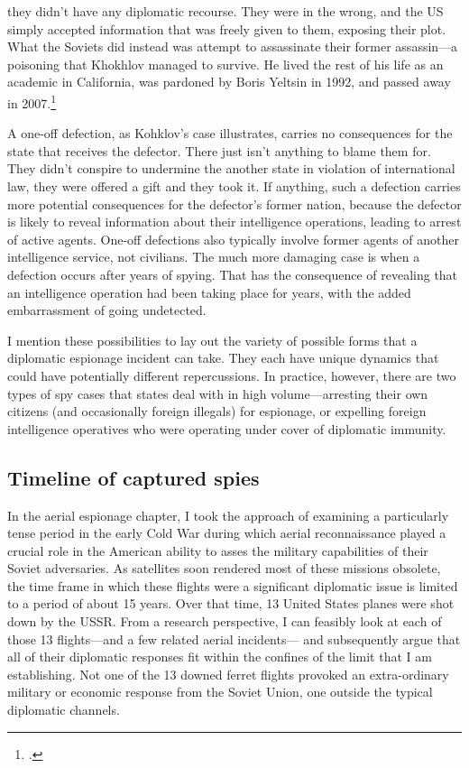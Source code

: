 \documentclass{report}
\begin{document}
\begin{refsegment}
they didn't have any diplomatic recourse. They were in the wrong, and the US simply accepted information that was freely given to them, exposing their plot. What the Soviets did instead was attempt to assassinate their former assassin---a poisoning that Khokhlov managed to survive. He lived the rest of his life as an academic in California, was pardoned by Boris Yeltsin in 1992, and passed away in 2007.\footcite[p.~57]{mickolus_counterintelligence_2015}

A one-off defection, as Kohklov's case illustrates, carries no consequences for the state that receives the defector. There just isn't anything to blame them for. They didn't conspire to undermine the another state in violation of international law, they were offered a gift and they took it. If anything, such a defection carries more potential consequences for the defector's former nation, because the defector is likely to reveal information about their intelligence operations, leading to arrest of active agents. One-off defections also typically involve former agents of another intelligence service, not civilians. The much more damaging case is when a defection occurs after years of spying. That has the consequence of revealing that an intelligence operation had been taking place for years, with the added embarrassment of going undetected.

I mention these possibilities to lay out the variety of possible forms that a diplomatic espionage incident can take. They each have unique dynamics that could have potentially different repercussions. In practice, however, there are two types of spy cases that states deal with in high volume---arresting their own citizens (and occasionally foreign illegals) for espionage, or expelling foreign intelligence operatives who were operating under cover of diplomatic immunity.

\subsection{Timeline of captured spies}
In the aerial espionage chapter, I took the approach of examining a particularly tense period in the early Cold War during which aerial reconnaissance played a crucial role in the American ability to asses the military capabilities of their Soviet adversaries. As satellites soon rendered most of these missions obsolete, the time frame in which these flights were a significant diplomatic issue is limited to a period of about 15 years. Over that time, 13 United States planes were shot down by the USSR. From a research perspective, I can feasibly look at each of those 13 flights---and a few related aerial incidents--- and subsequently argue that all of their diplomatic responses fit within the confines of the limit that I am establishing. Not one of the 13 downed ferret flights provoked an extra-ordinary military or economic response from the Soviet Union, one outside the typical diplomatic channels.


\end{refsegment}
\end{document}
